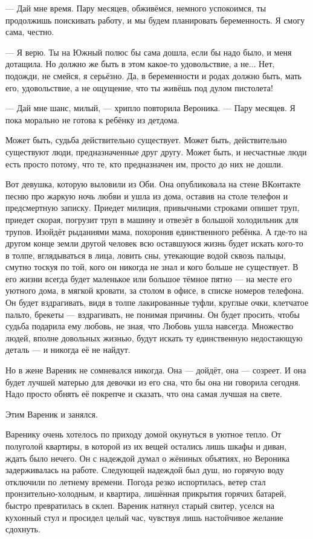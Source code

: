 --- Дай мне время.
Пару месяцев, обживёмся, немного успокоимся, ты продолжишь поискивать работу, и мы будем планировать беременность.
Я смогу сама, честно.

--- Я верю.
Ты на Южный полюс бы сама дошла, если бы надо было, и меня дотащила.
Но должно же быть в этом какое-то удовольствие, а не...
Нет, подожди, не смейся, я серьёзно.
Да, в беременности и родах должно быть, мать его, удовольствие, а не ощущение, что ты живёшь под дулом пистолета!

--- Дай мне шанс, милый, --- хрипло повторила Вероника.
--- Пару месяцев.
Я пока морально не готова к ребёнку из детдома.

\asterism

Может быть, судьба действительно существует.
Может быть, действительно существуют люди, предназначенные друг другу.
Может быть, и несчастные люди есть просто потому, что те, кто предназначен им, просто до них не дошли.

Вот девушка, которую выловили из Оби.
Она опубликовала на стене ВКонтакте песню про жаркую ночь любви и ушла из дома, оставив на столе телефон и предсмертную записку.
Приедет милиция, привычными строками опишет труп, приедет скорая, погрузит труп в машину и отвезёт в большой холодильник для трупов.
Изойдёт рыданиями мама, похоронив единственного ребёнка.
А где-то на другом конце земли другой человек всю оставшуюся жизнь будет искать кого-то в толпе, вглядываться в лица, ловить сны, утекающие водой сквозь пальцы, смутно тоскуя по той, кого он никогда не знал и кого больше не существует.
В его жизни всегда будет маленькое или большое тёмное пятно --- на месте его уютного дома, в мягкой кровати, за столом в офисе, в списке номеров телефона.
Он будет вздрагивать, видя в толпе лакированные туфли, круглые очки, клетчатое пальто, брекеты --- вздрагивать, не понимая причины.
Он будет просить, чтобы судьба подарила ему любовь, не зная, что Любовь ушла навсегда.
Множество людей, вполне довольных жизнью, будут искать ту единственную недостающую деталь --- и никогда её не найдут.

Но в жене Вареник не сомневался никогда.
Она --- дойдёт, она --- созреет.
И она будет лучшей матерью для девочки из его сна, что бы она ни говорила сегодня.
Надо просто обнять её покрепче и сказать, что она самая лучшая на свете.

Этим Вареник и занялся.

\asterism

\textspace

Варенику очень хотелось по приходу домой окунуться в уютное тепло.
От полуголой квартиры, в которой из их вещей остались лишь шкафы и диван, ждать было нечего.
Он с надеждой думал о жёниных объятиях, но Вероника задерживалась на работе.
Следующей надеждой был душ, но горячую воду отключили по летнему времени.
Погода резко испортилась, ветер стал пронзительно-холодным, и квартира, лишённая прикрытия горячих батарей, быстро превратилась в склеп.
Вареник натянул старый свитер, уселся на кухонный стул и просидел целый час, чувствуя лишь настойчивое желание сдохнуть.

